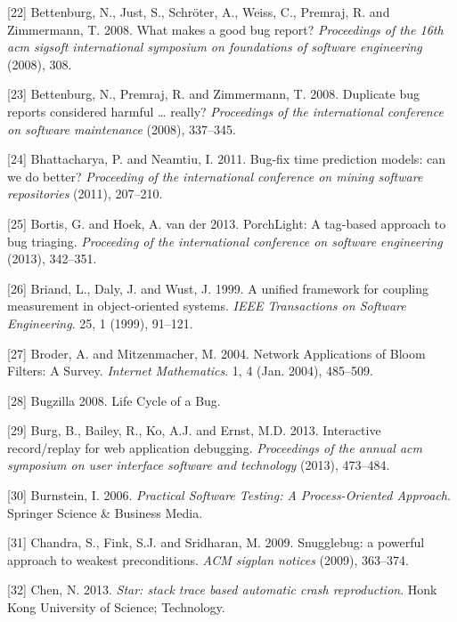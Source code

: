 \documentclass[12pt]{report}
\begin{document}
\hypertarget{ref-Bettenburg2008}{}
{[}22{]} Bettenburg, N., Just, S., Schröter, A., Weiss, C., Premraj, R.
and Zimmermann, T. 2008. What makes a good bug report? \emph{Proceedings
of the 16th acm sigsoft international symposium on foundations of
software engineering} (2008), 308.

\hypertarget{ref-Bettenburg2008a}{}
{[}23{]} Bettenburg, N., Premraj, R. and Zimmermann, T. 2008. Duplicate
bug reports considered harmful \ldots{} really? \emph{Proceedings of the
international conference on software maintenance} (2008), 337--345.

\hypertarget{ref-Bhattacharya2011}{}
{[}24{]} Bhattacharya, P. and Neamtiu, I. 2011. Bug-fix time prediction
models: can we do better? \emph{Proceeding of the international
conference on mining software repositories} (2011), 207--210.

\hypertarget{ref-Bortis2013}{}
{[}25{]} Bortis, G. and Hoek, A. van der 2013. PorchLight: A tag-based
approach to bug triaging. \emph{Proceeding of the international
conference on software engineering} (2013), 342--351.

\hypertarget{ref-Briand1999a}{}
{[}26{]} Briand, L., Daly, J. and Wust, J. 1999. A unified framework for
coupling measurement in object-oriented systems. \emph{IEEE Transactions
on Software Engineering}. 25, 1 (1999), 91--121.

\hypertarget{ref-Broder2004}{}
{[}27{]} Broder, A. and Mitzenmacher, M. 2004. Network Applications of
Bloom Filters: A Survey. \emph{Internet Mathematics}. 1, 4 (Jan. 2004),
485--509.

\hypertarget{ref-Bugzilla2008}{}
{[}28{]} Bugzilla 2008. Life Cycle of a Bug.

\hypertarget{ref-Burg2013}{}
{[}29{]} Burg, B., Bailey, R., Ko, A.J. and Ernst, M.D. 2013.
Interactive record/replay for web application debugging.
\emph{Proceedings of the annual acm symposium on user interface software
and technology} (2013), 473--484.

\hypertarget{ref-Burnstein2006}{}
{[}30{]} Burnstein, I. 2006. \emph{Practical Software Testing: A
Process-Oriented Approach}. Springer Science \& Business Media.

\hypertarget{ref-chandra2009snugglebug}{}
{[}31{]} Chandra, S., Fink, S.J. and Sridharan, M. 2009. Snugglebug: a
powerful approach to weakest preconditions. \emph{ACM sigplan notices}
(2009), 363--374.

\hypertarget{ref-Chen2013a}{}
{[}32{]} Chen, N. 2013. \emph{Star: stack trace based automatic crash
reproduction}. Honk Kong University of Science; Technology.
\end{document}
